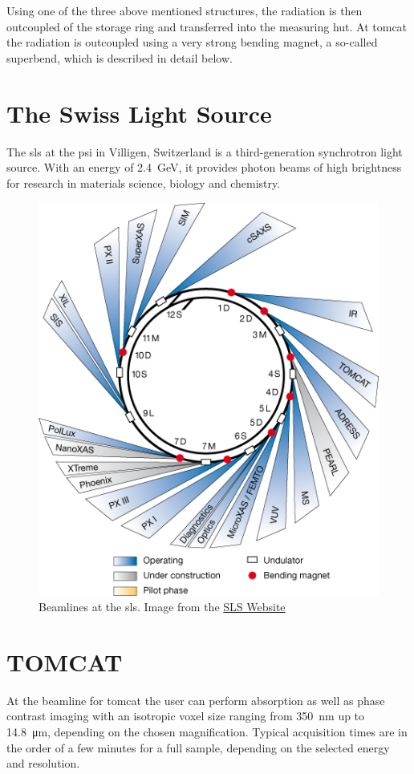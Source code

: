 Using one of the three above mentioned structures, the radiation is then outcoupled of the storage ring and transferred into the measuring hut. At \ac{tomcat} the radiation is outcoupled using a very strong bending magnet, a so-called superbend, which is described in detail below.

\section{The Swiss Light Source}
The \ac{sls} at the \ac{psi} in Villigen, Switzerland is a third-generation synchrotron light source. With an energy of \SI{2.4}{\giga\electronvolt}, it provides photon beams of high brightness for research in materials science, biology and chemistry.

\renewcommand{\imsize}{0.618\linewidth}%
\begin{figure}
	\centering
	\includegraphics[width=\imsize]{img/SLS_beamlines_2008}
	\caption[Beamlines at the Swiss Light Source]{Beamlines at the \ac{sls}. Image from the \href{http://sls.web.psi.ch/view.php/beamlines/}{SLS Website}}
	\label{fig:beamlines}
\end{figure}

\section{TOMCAT}\label{sec:tomcat}
At the beamline for \acf{tomcat} the user can perform absorption as well as phase contrast imaging with an isotropic voxel size ranging from \SI{350}{\nano\meter} up to \SI{14.8}{\micro\meter}, depending on the chosen magnification. Typical acquisition times are in the order of a few minutes for a full sample, depending on the selected energy and resolution.

